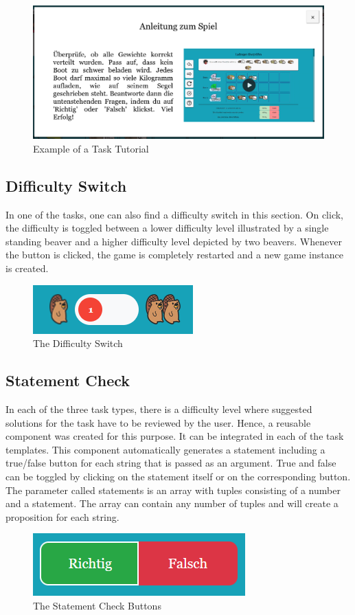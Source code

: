 \begin{figure}[H]
    \centering
    \includegraphics[width=1 \columnwidth]{figures/tutorial_example.png}
    \caption{Example of a Task Tutorial} 
    \label{fig:next} 
\end{figure}

\subsection{Difficulty Switch}
In one of the tasks, one can also find a difficulty switch in this section. On click, the difficulty is toggled between a lower difficulty level illustrated by a single standing beaver and a higher difficulty level depicted by two beavers. Whenever the button is clicked, the game is completely restarted and a new game instance is created.

\begin{figure}[H]
    \centering
    \includegraphics[width=0.4 \columnwidth]{figures/levels.png}
    \caption{The Difficulty Switch} 
    \label{fig:levels} 
\end{figure}

\newpage
\subsection{Statement Check}
\label{subsection:statementcheck}
In each of the three task types, there is a difficulty level where suggested solutions for the task have to be reviewed by the user. Hence, a reusable component was created for this purpose. It can be integrated in each of the task templates. This component automatically generates a statement including a true/false button for each string that is passed as an argument. True and false can be toggled by clicking on the statement itself or on the corresponding button. The parameter called statements is an array with tuples consisting of a number and a statement. The array can contain any number of tuples and will create a proposition for each string.

\begin{figure}[H]
    \centering
    \includegraphics[width=0.3 \columnwidth]{figures/tf-buttons.png}
    \caption{The Statement Check Buttons} 
    \label{fig:statement} 
\end{figure}
